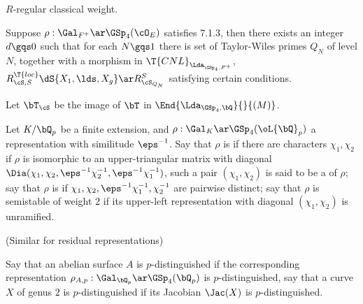 \documentclass[article, a4paper, twoside]{universal}
\begin{document}
\begin{cmt}
    \begin{dfn}[7.5.7]
        $R$-regular classical weight.
    \end{dfn}

    \begin{thm}[7.1.13]
        Suppose $\rho:\Gal_{F^{+}}\ar\GSp_{4}(\cO_{E})$ satisfies 7.1.3, then there exists an integer $d\gqs0$ such that for each $N\gqs1$ there is set of Taylor-Wiles primes $Q_{N}$ of level $N$, together with a morphism in $\T{CNL}_{\Lda_{\GSp_{4},F^{+}}}$, $R_{\cS,S}^{\T{loc}}\dS{X_{1},\lds,X_{g}}\ar R_{\cS_{Q_{N}}}^{S}$ satisfying certain conditions.
    \end{thm}

    \begin{dfn}[7.4.9]
        Let $\bT_{\cS}$ be the image of $\bT$ in $\End{\Lda_{\GSp_{4},\bQ}}{}{(M)}$.
    \end{dfn}

    \begin{dfn}[1.8.10]
        Let $K/\bQ_{p}$ be a finite extension, and $\rho:\Gal_{K}\ar\GSp_{4}(\oL{\bQ}_{p})$ a representation with similitude $\eps^{-1}$. Say that $\rho$ is  if there are characters $\chi_{1},\chi_{2}$ if $\rho$ is isomorphic to an upper-triangular matrix with diagonal $\Dia(\chi_{1},\chi_{2},\eps^{-1}\chi_{2}^{-1},\eps^{-1}\chi_{1}^{-1})$, such a pair $(\chi_{1},\chi_{2})$ is said to be a  of $\rho$; say that $\rho$ is  if $\chi_{1},\chi_{2},\eps^{-1}\chi_{1}^{-1},\chi_{2}^{-1}$ are pairwise distinct; say that $\rho$ is semistable of weight $2$ if its upper-left representation with diagonal $(\chi_{1},\chi_{2})$ is unramified.


        (Similar for residual representations)
    \end{dfn}
    
    \begin{dfn}[9.1.2]
        Say that an abelian surface $A$ is $p$-distinguished if the corresponding representation $\rho_{A,p}:\Gal_{\bQ_{p}}\ar\GSp_{4}(\bQ_{p})$ is $p$-distinguished, say that a curve $X$ of genus $2$ is $p$-distinguished if its Jacobian $\Jac(X)$ is $p$-distinguished.
    \end{dfn}
\end{cmt}


\printref
\end{document}
